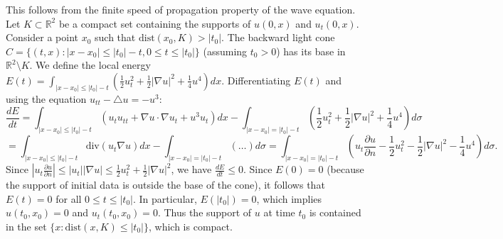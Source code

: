 \begin{solution}
This follows from the finite speed of propagation property of the wave equation. Let $K \subset \mathbb{R}^2$ be a compact set containing the supports of $u(0,x)$ and $u_t(0,x)$.
Consider a point $x_0$ such that $\text{dist}(x_0, K) > |t_0|$. The backward light cone $C = \{ (t, x) : |x - x_0| \leq |t_0| - t, 0 \leq t \leq |t_0| \}$ (assuming $t_0 > 0$) has its base in $\mathbb{R}^2 \setminus K$.
We define the local energy $E(t) = \int_{|x-x_0| \leq |t_0|-t} \left( \frac{1}{2} u_t^2 + \frac{1}{2} |\nabla u|^2 + \frac{1}{4} u^4 \right) dx$.
Differentiating $E(t)$ and using the equation $u_{tt} - \triangle u = -u^3$:
\[
\frac{dE}{dt} = \int_{|x-x_0| \leq |t_0|-t} (u_t u_{tt} + \nabla u \cdot \nabla u_t + u^3 u_t) dx - \int_{|x-x_0| = |t_0|-t} \left( \frac{1}{2} u_t^2 + \frac{1}{2} |\nabla u|^2 + \frac{1}{4} u^4 \right) d\sigma
\]
\[
= \int_{|x-x_0| \leq |t_0|-t} \text{div}(u_t \nabla u) dx - \int_{|x-x_0| = |t_0|-t} (\dots) d\sigma = \int_{|x-x_0| = |t_0|-t} (u_t \frac{\partial u}{\partial n} - \frac{1}{2} u_t^2 - \frac{1}{2} |\nabla u|^2 - \frac{1}{4} u^4) d\sigma.
\]
Since $|u_t \frac{\partial u}{\partial n}| \leq |u_t| |\nabla u| \leq \frac{1}{2} u_t^2 + \frac{1}{2} |\nabla u|^2$, we have $\frac{dE}{dt} \leq 0$.
Since $E(0) = 0$ (because the support of initial data is outside the base of the cone), it follows that $E(t) = 0$ for all $0 \leq t \leq |t_0|$.
In particular, $E(|t_0|) = 0$, which implies $u(t_0, x_0) = 0$ and $u_t(t_0, x_0) = 0$.
Thus the support of $u$ at time $t_0$ is contained in the set $\{ x : \text{dist}(x, K) \leq |t_0| \}$, which is compact.
\end{solution}
